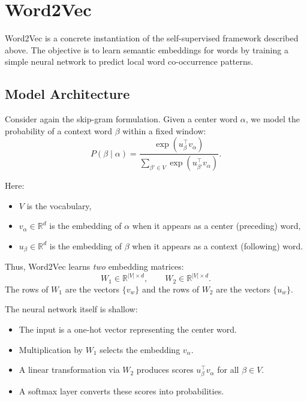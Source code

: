 \section{Word2Vec}

\medskip

Word2Vec is a concrete instantiation of the self-supervised framework described above. The objective is to learn semantic embeddings for words by training a simple neural network to predict local word co-occurrence patterns.

\bigskip

\subsection{Model Architecture}

\medskip

Consider again the skip-gram formulation. Given a center word $\alpha$, we model the probability of a context word $\beta$ within a fixed window:
\[
P(\beta \mid \alpha)
=
\frac{\exp(u_\beta^\top v_\alpha)}
{\sum_{\beta' \in V} \exp(u_{\beta'}^\top v_\alpha)}.
\]

Here:
\begin{itemize}
    \item $V$ is the vocabulary,
    \item $v_\alpha \in \mathbb{R}^d$ is the embedding of $\alpha$ when it appears as a center (preceding) word,
    \item $u_\beta \in \mathbb{R}^d$ is the embedding of $\beta$ when it appears as a context (following) word.
\end{itemize}

Thus, Word2Vec learns \emph{two} embedding matrices:
\[
W_1 \in \mathbb{R}^{|V| \times d}, 
\qquad
W_2 \in \mathbb{R}^{|V| \times d}.
\]
The rows of $W_1$ are the vectors $\{v_w\}$ and the rows of $W_2$ are the vectors $\{u_w\}$.

\medskip

The neural network itself is shallow:
\begin{itemize}
    \item The input is a one-hot vector representing the center word.
    \item Multiplication by $W_1$ selects the embedding $v_\alpha$.
    \item A linear transformation via $W_2$ produces scores $u_{\beta}^\top v_\alpha$ for all $\beta \in V$.
    \item A softmax layer converts these scores into probabilities.
\end{itemize}

